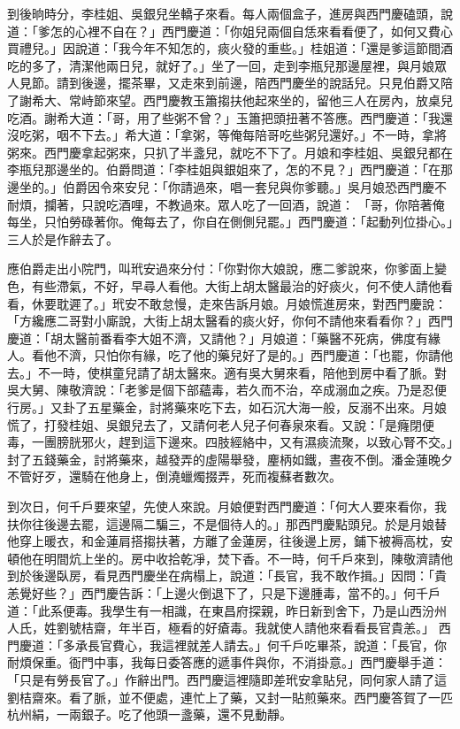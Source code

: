 到後晌時分，李桂姐、吳銀兒坐轎子來看。每人兩個盒子，進房與西門慶磕頭，說道：「爹怎的心裡不自在？」西門慶道：「你姐兒兩個自恁來看看便了，如何又費心買禮兒。」因說道：「我今年不知怎的，痰火發的重些。」桂姐道：「還是爹這節間酒吃的多了，清潔他兩日兒，就好了。」坐了一回，走到李瓶兒那邊屋裡，與月娘眾人見節。請到後邊，擺茶畢，又走來到前邊，陪西門慶坐的說話兒。只見伯爵又陪了謝希大、常峙節來望。西門慶教玉簫搊扶他起來坐的，留他三人在房內，放桌兒吃酒。謝希大道：「哥，用了些粥不曾？」玉簫把頭扭著不答應。西門慶道：「我還沒吃粥，咽不下去。」希大道：「拿粥，等俺每陪哥吃些粥兒還好。」不一時，拿將粥來。西門慶拿起粥來，只扒了半盞兒，就吃不下了。月娘和李桂姐、吳銀兒都在李瓶兒那邊坐的。伯爵問道：「李桂姐與銀姐來了，怎的不見？」西門慶道：「在那邊坐的。」伯爵因令來安兒：「你請過來，唱一套兒與你爹聽。」吳月娘恐西門慶不耐煩，攔著，只說吃酒哩，不教過來。眾人吃了一回酒，說道： 「哥，你陪著俺每坐，只怕勞碌著你。俺每去了，你自在側側兒罷。」西門慶道：「起動列位掛心。」三人於是作辭去了。

應伯爵走出小院門，叫玳安過來分付：「你對你大娘說，應二爹說來，你爹面上變色，有些滯氣，不好，早尋人看他。大街上胡太醫最治的好痰火，何不使人請他看看，休要耽遲了。」玳安不敢怠慢，走來告訴月娘。月娘慌進房來，對西門慶說：「方纔應二哥對小廝說，大街上胡太醫看的痰火好，你何不請他來看看你？」西門慶道：「胡太醫前番看李大姐不濟，又請他？」月娘道：「藥醫不死病，佛度有緣人。看他不濟，只怕你有緣，吃了他的藥兒好了是的。」西門慶道：「也罷，你請他去。」不一時，使棋童兒請了胡太醫來。適有吳大舅來看，陪他到房中看了脈。對吳大舅、陳敬濟說：「老爹是個下部蘊毒，若久而不治，卒成溺血之疾。乃是忍便行房。」又卦了五星藥金，討將藥來吃下去，如石沉大海一般，反溺不出來。月娘慌了，打發桂姐、吳銀兒去了，又請何老人兒子何春泉來看。又說：「是癃閉便毒，一團膀胱邪火，趕到這下邊來。四肢經絡中，又有濕痰流聚，以致心腎不交。」封了五錢藥金，討將藥來，越發弄的虛陽舉發，麈柄如鐵，晝夜不倒。潘金蓮晚夕不管好歹，還騎在他身上，倒澆蠟燭掇弄，死而複蘇者數次。

到次日，何千戶要來望，先使人來說。月娘便對西門慶道：「何大人要來看你，我扶你往後邊去罷，這邊隔二騙三，不是個待人的。」那西門慶點頭兒。於是月娘替他穿上暖衣，和金蓮肩搭搊扶著，方離了金蓮房，往後邊上房，鋪下被褥高枕，安頓他在明間炕上坐的。房中收拾乾凈，焚下香。不一時，何千戶來到，陳敬濟請他到於後邊臥房，看見西門慶坐在病榻上，說道：「長官，我不敢作揖。」因問：「貴恙覺好些？」西門慶告訴：「上邊火倒退下了，只是下邊腫毒，當不的。」何千戶道：「此系便毒。我學生有一相識，在東昌府探親，昨日新到舍下，乃是山西汾州人氏，姓劉號桔齋，年半百，極看的好瘡毒。我就使人請他來看看長官貴恙。」 西門慶道：「多承長官費心，我這裡就差人請去。」何千戶吃畢茶，說道：「長官，你耐煩保重。衙門中事，我每日委答應的遞事件與你，不消掛意。」西門慶舉手道：「只是有勞長官了。」作辭出門。西門慶這裡隨即差玳安拿貼兒，同何家人請了這劉桔齋來。看了脈，並不便處，連忙上了藥，又封一貼煎藥來。西門慶答賀了一匹杭州絹，一兩銀子。吃了他頭一盞藥，還不見動靜。

